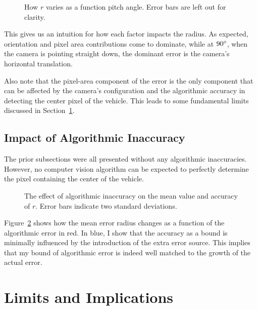 \documentclass[a4paper,12pt,twoside,openright]{report}
\begin{document}
\begin{figure}[htb]
    \begin{center}
        \resizebox{.95\linewidth}{!}{}
    \end{center}
    \caption[$r$ as a Function of Pitch Angle]{How $r$ varies as a function pitch angle. Error bars are left out for clarity.}
    \label{fig:camera:radius versus pitch}
\end{figure}


This gives us an intuition for how each factor impacts the radius.
As expected, orientation and pixel area contributions
come to dominate, while at $90\degree$, when the camera is pointing straight down, the dominant
error is the camera's horizontal translation.

Also note that the pixel-area component of the error is the only component that
can be affected by the camera's configuration and the algorithmic 
accuracy in detecting the center pixel of the vehicle. This leads
to some fundamental limits discussed in Section~\ref{sec:camera:implications}.

\subsection{Impact of Algorithmic Inaccuracy}

The prior subsections were all presented without any algorithmic inaccuracies.
However, no computer vision algorithm can be expected to perfectly determine
the pixel containing the center of the vehicle.

\begin{figure}[htb]
    \begin{center}
        
    \end{center}
    \caption[Effect of Algorithmic Inaccuracy]{The effect of algorithmic inaccuracy on the mean value and accuracy of $r$. Error bars indicate two standard deviations.}
    \label{fig:camera:algorithm effect}
\end{figure}


Figure~\ref{fig:camera:algorithm effect} shows how the mean error radius changes as a function of the 
algorithmic error in red. In blue, I show that the accuracy as a bound is minimally influenced 
by the introduction of the extra error source. This implies that my bound of
algorithmic error is indeed well matched to the growth of the actual error.


\section{Limits and Implications}
\label{sec:camera:implications}
\end{document}
